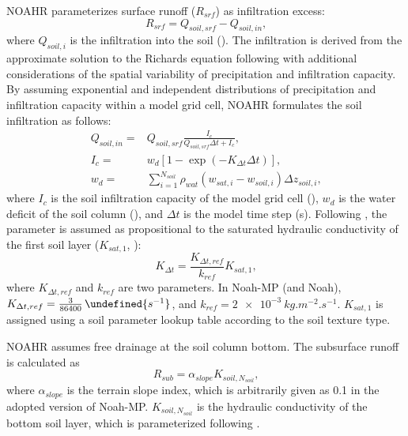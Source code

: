 \documentclass[essd, manuscript]{copernicus}
\let\unit\undefined
\begin{document}
NOAHR parameterizes surface runoff (\(R_{srf}\)) as infiltration excess:
\begin{equation}
  R_{srf} = Q_{soil,srf} - Q_{soil,in}
  \text{,}
\end{equation}
where \(Q_{soil,i}\) is the infiltration into the soil (\unit{kg.m^{-2}.s^{-1}}). The infiltration is derived from the approximate solution to the Richards equation following \citet{philip1969AiH} with additional considerations of the spatial variability of precipitation and infiltration capacity. By assuming exponential and independent distributions of precipitation and infiltration capacity within a model grid cell, NOAHR formulates the soil infiltration as follows:
\begin{align}
  Q_{soil,in} = & Q_{soil,srf} \frac{I_c}{Q_{soil,srf} \Delta t + I_c}
  \text{,} \\
  I_{c} =       & w_d [1-\exp(-K_{\Delta t} \Delta t)]
  \text{,} \\
  w_d =         & \sum_{i=1}^{N_{soil}} \rho_{wat} (w_{sat,i} - w_{soil,i}) \Delta z_{soil,i}
  \text{,}
\end{align}
where \(I_{c}\) is the soil infiltration capacity of the model grid cell (\unit{kg.m^{-2}}), \(w_d\) is the water deficit of the soil column (\unit{kg.m^{-2}}), and \(\Delta t\) is the model time step (s). Following \citep{chen2001MWR}, the parameter is assumed as propositional to the saturated hydraulic conductivity of the first soil layer (\(K_{sat,1}\), \unit{kg.m^{-2}.s^{-1}}):
\begin{equation}
  K_{\Delta t} = \frac{K_{\Delta t,ref}}{k_{ref}} K_{sat,1}
  \text{,}
\end{equation}
where \(K_{\Delta t,ref}\) and \(k_{ref}\) are two parameters. In Noah-MP (and Noah), \(K_{\Delta t,ref} = \frac{3}{86400}\,\unit{s^{-1}}\), and \(k_{ref}=\qty{2e-3}{kg.m^{-2}.s^{-1}}\). \(K_{sat,1}\) is assigned using a soil parameter lookup table according to the soil texture type.

NOAHR assumes free drainage at the soil column bottom. The subsurface runoff is calculated as
\begin{equation}
  R_{sub} = \alpha_{slope} K_{soil,N_{soil}} \label{eq:noahr:rsub}
  \text{,}
\end{equation}
where \(\alpha_{slope}\) is the terrain slope index, which is arbitrarily given as 0.1 in the adopted version of Noah-MP\@. \(K_{soil,N_{soil}}\) is the hydraulic conductivity of the bottom soil layer, which is parameterized following \citet{clapp1978WRR}.
\end{document}
